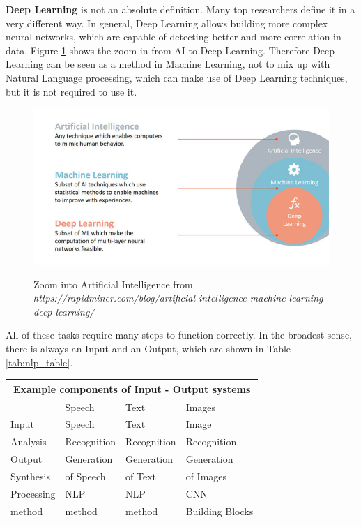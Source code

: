 \textbf{Deep Learning} is not an absolute definition. Many top researchers define it in a very different way. In general, Deep Learning allows building more complex neural networks, which are capable of detecting better and more correlation in data. Figure \ref{ai} shows the zoom-in from AI to Deep Learning. Therefore Deep Learning can be seen as a method in Machine Learning, not to mix up with Natural Language processing, which can make use of Deep Learning techniques, but it is not required to use it.

\begin{figure}
	\begin{center}
		\includegraphics[width=6in]{photos/ai_ml_dl.jpg}\\
		\caption{Zoom into Artificial Intelligence from \textit{https://rapidminer.com/blog/artificial-intelligence-machine-learning-deep-learning/}}\label{ai}
	\end{center}
\end{figure}

All of these tasks require many steps to function correctly. In the broadest sense, there is always an Input and an Output, which are shown in Table \ref{tab:nlp_table}.

\begin{center} 
	\begin{tabular}{ |p{3cm}||p{3cm}|p{3cm}|p{3cm}|}
		\hline
		\multicolumn{4}{|c|}{\textbf{Example components of Input - Output systems}}\\ \hline\hline
		&Speech &Text &Images \\ \hline
		Input &Speech &Text &Image \\
		Analysis &Recognition  &Recognition     &Recognition \\ \hline \hline
		Output &Generation &\cellcolor[HTML]{F3E687}Generation &Generation \\
		Synthesis &of Speech & \cellcolor[HTML]{F3E687}of Text &of Images \\ \hline \hline
		Processing &NLP &\cellcolor[HTML]{7ebfd3}NLP &CNN \\
		method &method  &\cellcolor[HTML]{7ebfd3}method     &Building Blocks \\ \hline
	\end{tabular}
	\label{tab:nlp_table}
\end{center}

